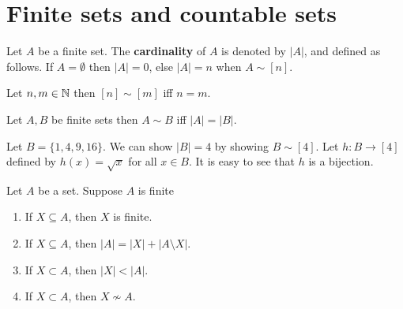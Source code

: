 \documentclass[a4paper,english,12pt]{article}   	%
\begin{document}
\section{Finite sets and countable sets}
\begin{defn} Let $A$ be a finite set. The \textbf{cardinality} of $A$ is denoted by $|A|$, and defined as follows. If $A= \emptyset$ then $|A|=0$, else $|A|=n$ when $A \sim [n]$.
\end{defn}
\begin{lem} Let $n,m \in \mathbb{N}$ then $[n] \sim [m]$ iff $n=m$.
\end{lem}
\begin{cor}\label{Cor:EqCard} Let $A,B$ be finite sets then $A \sim B$ iff $|A|=|B|$.
\end{cor}
\begin{exmp} Let $B = \{1,4,9,16\}$. We can show $|B| = 4$ by showing $B \sim [4]$. Let $h: B \to [4]$ defined by $h(x) = \sqrt{x}$ for all $x \in B$. It is easy to see that $h$ is a bijection.
\end{exmp}
\begin{thm}\label{Thm:SubsetFiniteSets} Let $A$ be a set. Suppose $A$ is finite
\begin{enumerate}[i$\_$]
\item If $X \subseteq A$, then $X$ is finite.
\item If $X \subseteq A$, then $|A|=|X|+|A \setminus X|$.
\item If $X \subset A$, then $|X|<|A|$.
\item If $X \subset A$, then $X \nsim A$.
\end{enumerate}
\end{thm}
\end{document}
